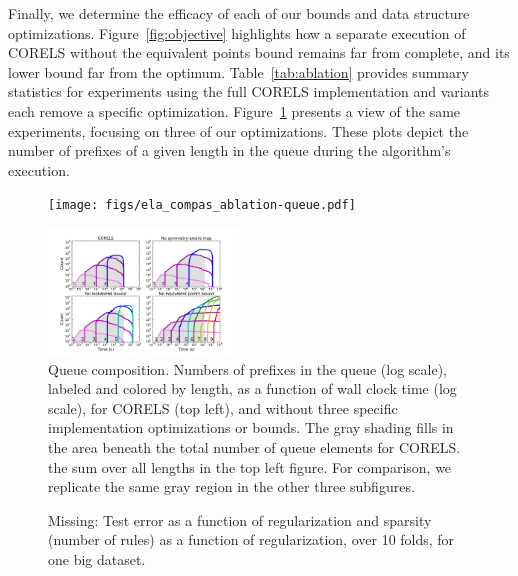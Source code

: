 Finally, we determine the efficacy of each of our bounds and data structure optimizations.
%
Figure~\ref{fig:objective} highlights how a separate execution of CORELS without
the equivalent points bound remains far from complete,
and its lower bound far from the optimum.
%
Table~\ref{tab:ablation} provides summary statistics for experiments using
the full CORELS implementation and variants each remove a specific optimization.
%
Figure~\ref{fig:queue} presents a view of the same experiments, focusing
on three of our optimizations. These plots depict the number of
prefixes of a given length in the queue during the algorithm's execution.

\begin{figure}[t!]
\begin{center}
\begin{arxiv}
\texttt{[image: figs/ela\_compas\_ablation-queue.pdf]}
\end{arxiv}
\begin{kdd}
\includegraphics[trim={30mm 15mm 35mm 30mm}, width=0.45\textwidth]{figs/kdd_compas_ablation_small-queue.pdf}
\end{kdd}
\end{center}
\caption{Queue composition. %
%
Numbers of prefixes in the queue (log scale), labeled and colored by length,
as a function of wall clock time (log scale), for CORELS (top left),
and without three specific implementation optimizations or bounds.
%
The gray shading fills in the area beneath the total number of
queue elements for CORELS.
\ie the sum over all lengths in the top left figure.
%
For comparison, we replicate the same gray region
in the other three subfigures.
}
\label{fig:queue}
\end{figure}

\begin{arxiv}
\begin{figure}[t!]
\begin{center}
\end{center}
\caption{Missing:  Test error as a function of regularization and sparsity
(number of rules) as a function of regularization, over 10 folds,
for one big dataset.}
\label{fig:regularization}
\end{figure}
\end{arxiv}

